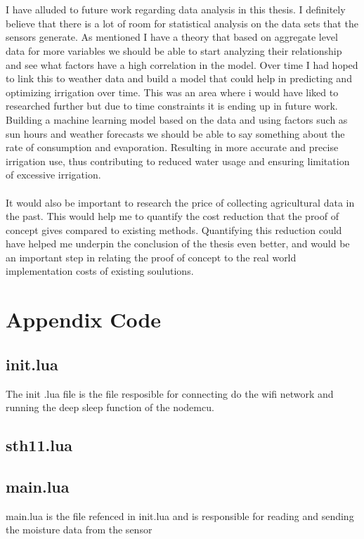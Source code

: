 \documentclass[]{uiophd}
\begin{document}
\\\\
I have alluded to future work regarding data analysis in this thesis. I definitely believe that there is a lot of room for statistical analysis on the data sets that the sensors generate. As mentioned I have a theory that based on aggregate level data for more variables we should be able to start analyzing their relationship and see what factors have a high correlation in the model. Over time I had hoped to link this to weather data and build a model that could help in predicting and optimizing irrigation over time. This was an area where i would have liked to researched further but due to time constraints it is ending up in future work. Building a machine learning model based on the data and using factors such as sun hours and weather forecasts we should be able to say something about the rate of consumption and evaporation. Resulting in more accurate and precise irrigation use, thus contributing to reduced water usage and ensuring limitation of excessive irrigation.
\\\\
It would also be important to research the price of collecting agricultural data in the past. This would help me to quantify the cost reduction that the proof of concept gives compared to existing methods. Quantifying this reduction could have helped me underpin the conclusion of the thesis even better, and would be an important step in relating the proof of concept to the real world implementation costs of existing soulutions.

\printbibliography

\chapter{Appendix Code}
\linespread{1}

\section{init.lua}
The init .lua file is the file resposible for connecting do the wifi network and running the deep sleep function of the nodemcu.


\section{sth11.lua}


\section{main.lua}
main.lua is the file refenced in init.lua and is responsible for reading and sending the moisture data from the sensor

\end{document}
